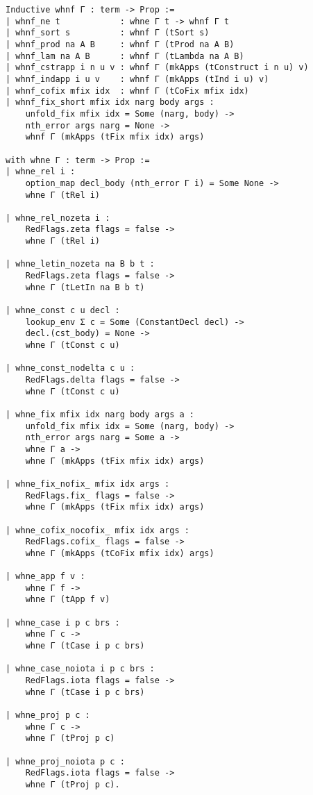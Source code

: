 \begin{verbatim}
Inductive whnf Γ : term -> Prop :=
| whnf_ne t            : whne Γ t -> whnf Γ t
| whnf_sort s          : whnf Γ (tSort s)
| whnf_prod na A B     : whnf Γ (tProd na A B)
| whnf_lam na A B      : whnf Γ (tLambda na A B)
| whnf_cstrapp i n u v : whnf Γ (mkApps (tConstruct i n u) v)
| whnf_indapp i u v    : whnf Γ (mkApps (tInd i u) v)
| whnf_cofix mfix idx  : whnf Γ (tCoFix mfix idx)
| whnf_fix_short mfix idx narg body args :
    unfold_fix mfix idx = Some (narg, body) ->
    nth_error args narg = None ->
    whnf Γ (mkApps (tFix mfix idx) args)

with whne Γ : term -> Prop :=
| whne_rel i :
    option_map decl_body (nth_error Γ i) = Some None ->
    whne Γ (tRel i)

| whne_rel_nozeta i :
    RedFlags.zeta flags = false ->
    whne Γ (tRel i)

| whne_letin_nozeta na B b t :
    RedFlags.zeta flags = false ->
    whne Γ (tLetIn na B b t)

| whne_const c u decl :
    lookup_env Σ c = Some (ConstantDecl decl) ->
    decl.(cst_body) = None ->
    whne Γ (tConst c u)

| whne_const_nodelta c u :
    RedFlags.delta flags = false ->
    whne Γ (tConst c u)

| whne_fix mfix idx narg body args a :
    unfold_fix mfix idx = Some (narg, body) ->
    nth_error args narg = Some a ->
    whne Γ a ->
    whne Γ (mkApps (tFix mfix idx) args)

| whne_fix_nofix_ mfix idx args :
    RedFlags.fix_ flags = false ->
    whne Γ (mkApps (tFix mfix idx) args)

| whne_cofix_nocofix_ mfix idx args :
    RedFlags.cofix_ flags = false ->
    whne Γ (mkApps (tCoFix mfix idx) args)

| whne_app f v :
    whne Γ f ->
    whne Γ (tApp f v)

| whne_case i p c brs :
    whne Γ c ->
    whne Γ (tCase i p c brs)

| whne_case_noiota i p c brs :
    RedFlags.iota flags = false ->
    whne Γ (tCase i p c brs)

| whne_proj p c :
    whne Γ c ->
    whne Γ (tProj p c)

| whne_proj_noiota p c :
    RedFlags.iota flags = false ->
    whne Γ (tProj p c).
\end{verbatim}

